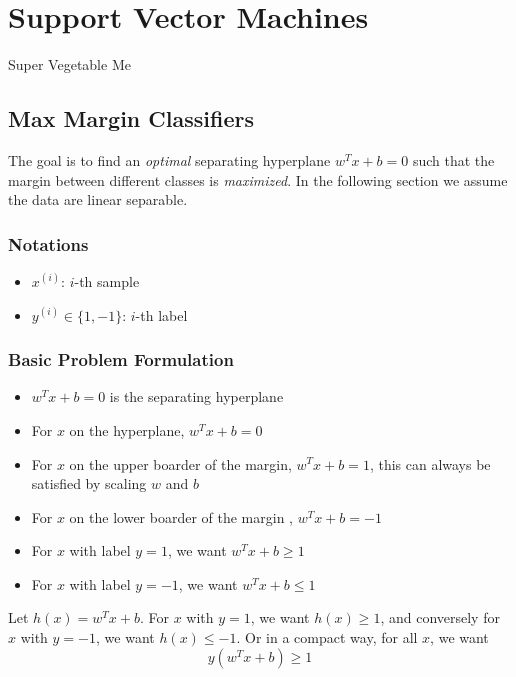 \chapter{Support Vector Machines}
Super Vegetable Me
\newpage


\section{Max Margin Classifiers}
    The goal is to find an \emph{optimal} separating hyperplane $w^Tx+b = 0$ such that the margin between different classes is \emph{maximized}. In the following section we assume the data are linear separable.

    \subsection{Notations}
        \begin{itemize}
            \item $x^{(i)}$: $i$-th sample
            \item $y^{(i)} \in \{1, -1\}$: $i$-th label
        \end{itemize}

    \subsection{Basic Problem Formulation}
        \begin{itemize}
            \item $w^Tx + b = 0$ is the separating hyperplane
            \item For $x$ on the hyperplane, $w^Tx + b = 0$
            \item For $x$ on the upper boarder of the margin, $w^Tx+b = 1$, this can always be satisfied by scaling $w$ and $b$
            \item For $x$ on the lower boarder of the margin , $w^Tx+b = -1$
            \item For $x$ with label $y=1$, we want $w^Tx+b\ge1$
            \item For $x$ with label $y=-1$, we want $w^Tx+b\le1$
        \end{itemize}
        Let $h(x) = w^Tx + b$. For $x$ with $y=1$, we want $h(x) \ge 1$, and conversely for $x$ with $y=-1$, we want $h(x) \le -1$. Or in a compact way, for all $x$, we want
        \[ y(w^Tx + b) \ge 1 \]

